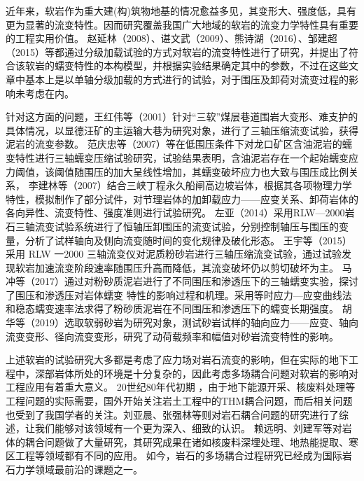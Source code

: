 近年来，软岩作为重大建(构)筑物地基的情况愈益多见，其变形大、强度低，具有更为显著的流变特性。因而研究覆盖我国广大地域的软岩的流变力学特性具有重要的工程实用价值。
赵延林（2008）、谌文武（2009）、熊诗湖（2016）、邹建超（2015）等都通过分级加载试验的方式对软岩的流变特性进行了研究，并提出了符合该软岩的蠕变特性的本构模型，并根据实验结果确定其中的参数\cite{赵延林2008,谌文武2009,熊诗湖2016,邹建超2015}，不过在这些文章中基本上是以单轴分级加载的方式进行的试验，对于围压及卸荷对流变过程的影响未考虑在内。

针对这方面的问题，王红伟等（2001）针对“三软”煤层巷道围岩大变形、难支护的具体情况，以显德汪矿的主运输大巷为研究对象，进行了三轴压缩流变试验，获得泥岩的流变参数\cite{王红伟2001}。
范庆忠等（2007）等在低围压条件下对龙口矿区含油泥岩的蠕变特性进行三轴蠕变压缩试验研究，试验结果表明，含油泥岩存在一个起始蠕变应力阈值，该阈值随围压的加大呈线性增加，其蠕变破坏应力也大致与围压成比例关系\cite{范庆忠2007}，
李建林等（2007）结合三峡丁程永久船闸高边坡岩体，根据其各项物理力学特性，模拟制作了部分试件，对节理岩体的加卸载应力——应变关系、卸荷岩体的各向异性、流变特性、强度准则进行试验研究\cite{李建林2007}。
左亚（2014）采用RLW—2000岩石三轴流变试验系统进行了恒轴压卸围压的流变试验，分别控制轴压与围压的变量，分析了试样轴向及侧向流变随时间的变化规律及破化形态\cite{左亚2014}。
王宇等（2015）采用 RLW 一2000 三轴流变仪对泥质粉砂岩进行三轴压缩流变试验，通过试验发现软岩加速流变阶段速率随围压升高而降低，其流变破坏仍以剪切破坏为主\cite{王宇2015}。
马冲等（2017）通过对粉砂质泥岩进行了不同围压和渗透压下的三轴蠕变实验，探讨了围压和渗透压对岩体蠕变
特性的影响过程和机理。采用等时应力—应变曲线法和稳态蠕变速率法求得了粉砂质泥岩在不同围压和渗透压下的蠕变长期强度\cite{马冲2017}。
胡华等（2019）选取软弱砂岩为研究对象，测试砂岩试样的轴向应力——应变、轴向流变变形、径向流变变形，研究了动荷载频率和幅值对砂岩流变特性的影响\cite{胡华2019}。

上述软岩的试验研究大多都是考虑了应力场对岩石流变的影响，但在实际的地下工程中，深部岩体所处的环境是十分复杂的，因此考虑多场耦合问题对软岩的影响对工程应用有着重大意义。
20世纪80年代初期 ，由于地下能源开采、核废料处理等工程问题的实际需要，国外开始关注岩土工程中的THM耦合问题，而后相关问题也受到了我国学者的关注。刘亚晨、张强林等则对岩石耦合问题的研究进行了综述，让我们能够对该领域有一个更为深入、细致的认识\cite{刘亚晨1999,张强林2007}。
赖远明、刘建军等对岩体的耦合问题做了大量研究，其研究成果在诸如核废料深埋处理、地热能提取、寒区工程等领域都有不同的应用\cite{赖远明1999,刘建军2004}。
如今，岩石的多场耦合过程研究已经成为国际岩石力学领域最前沿的课题之一。


